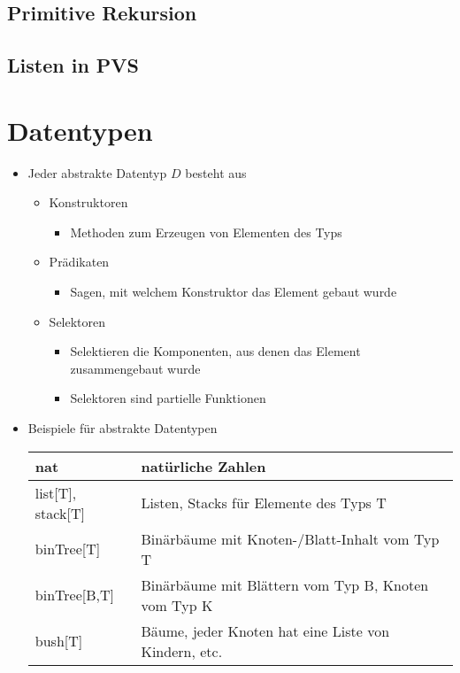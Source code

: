 \documentclass{scrartcl}
\begin{document}
\subsection{Primitive Rekursion}

\subsection{Listen in PVS}

\pagebreak
\section{Datentypen}

\begin{itemize}
	\item Jeder abstrakte Datentyp $ D $ besteht aus
	\begin{itemize}
		\item Konstruktoren
		\begin{itemize}
			\item Methoden zum Erzeugen von Elementen des Typs
		\end{itemize}
		\item Prädikaten
		\begin{itemize}
			\item Sagen, mit welchem Konstruktor das Element gebaut wurde
		\end{itemize}
		\item Selektoren
		\begin{itemize}
			\item Selektieren die Komponenten, aus denen das Element zusammengebaut wurde
			\item Selektoren sind partielle Funktionen
		\end{itemize}
	\end{itemize}
	\item Beispiele für abstrakte Datentypen \\
	\renewcommand{\arraystretch}{2}
	\begin{tabular}{l|l}
		nat & natürliche Zahlen  \\ 
		\hline 
		list[T], stack[T] & Listen, Stacks für Elemente des Typs T \\ 
		\hline 
		binTree[T] & Binärbäume mit Knoten-/Blatt-Inhalt vom Typ T \\ 
		\hline 
		binTree[B,T] & Binärbäume mit Blättern vom Typ B, Knoten vom Typ K \\ 
		\hline 
		bush[T] & Bäume, jeder Knoten hat eine Liste von Kindern, etc. \\ 
	\end{tabular} 
\end{itemize}
\end{document}
